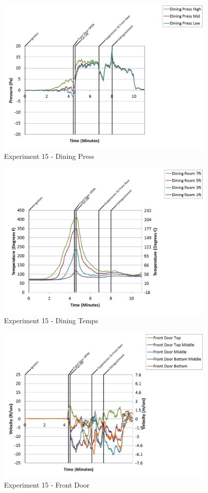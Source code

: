 \documentclass{article}
\begin{document}
\begin{appendices}
	\begin{figure}[h!]
		\centering
		\includegraphics[height=3.05in]{0_Images/Results_Charts/Exp_15_Charts/DiningPress.pdf}
		\caption{Experiment 15 - Dining Press}
	\end{figure}
 
	\clearpage

	\begin{figure}[h!]
		\centering
		\includegraphics[height=3.05in]{0_Images/Results_Charts/Exp_15_Charts/DiningTemps.pdf}
		\caption{Experiment 15 - Dining Temps}
	\end{figure}
 

	\begin{figure}[h!]
		\centering
		\includegraphics[height=3.05in]{0_Images/Results_Charts/Exp_15_Charts/FrontDoor.pdf}
		\caption{Experiment 15 - Front Door}
	\end{figure}
 

\end{appendices}
\end{document}
